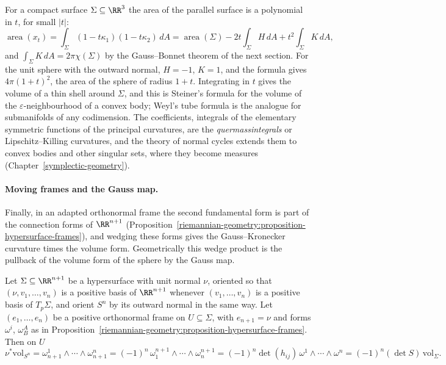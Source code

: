 \begin{remark}\label{riemannian-geometry:remark-steiner}
For a compact surface $\Sigma \subseteq \RR^3$ the area of the parallel surface is a polynomial in $t$, for small $|t|$:
\[
\operatorname{area}(x_t) = \int_\Sigma(1 - t\kappa_1)(1 - t\kappa_2)\,dA = \operatorname{area}(\Sigma) - 2t\int_\Sigma H\,dA + t^2\int_\Sigma K\,dA,
\]
and $\int_\Sigma K\,dA = 2\pi\chi(\Sigma)$ by the Gauss--Bonnet theorem of the next section. For the unit sphere with the outward normal, $H = -1$, $K = 1$, and the formula gives $4\pi(1 + t)^2$, the area of
the sphere of radius $1 + t$. Integrating in $t$ gives the volume of a thin shell around $\Sigma$, and this is Steiner's formula for the volume of the $\varepsilon$-neighbourhood of a convex body; Weyl's tube formula
is the analogue for submanifolds of any codimension. The coefficients, integrals of the elementary symmetric functions of the principal curvatures, are the \emph{quermassintegrals} or Lipschitz--Killing curvatures,
and the theory of normal cycles extends them to convex bodies and other singular sets, where they become measures (Chapter~\ref{symplectic-geometry}).
\end{remark}

\paragraph{Moving frames and the Gauss map.} Finally, in an adapted orthonormal frame the second fundamental form is part of the connection forms of $\RR^{n+1}$
(Proposition~\ref{riemannian-geometry:proposition-hypersurface-frames}), and wedging these forms gives the Gauss--Kronecker curvature times the volume form. Geometrically this wedge product is the pullback of the volume
form of the sphere by the Gauss map.

\begin{proposition}\label{riemannian-geometry:proposition-gauss-map-volume}
Let $\Sigma \subseteq \RR^{n+1}$ be a hypersurface with unit normal $\nu$, oriented so that $(\nu, v_1, \ldots, v_n)$ is a positive basis of $\RR^{n+1}$ whenever $(v_1, \ldots, v_n)$ is a positive basis of $T_p\Sigma$, and orient
$S^n$ by its outward normal in the same way. Let $(e_1, \ldots, e_n)$ be a positive orthonormal frame on $U \subseteq \Sigma$, with $e_{n+1} = \nu$ and forms $\omega^i$, $\omega^A_B$ as in
Proposition~\ref{riemannian-geometry:proposition-hypersurface-frames}. Then on $U$
\[
\nu^*\mathrm{vol}_{S^n} = \omega^1_{n+1} \wedge \cdots \wedge \omega^n_{n+1} = (-1)^n\,\omega^{n+1}_1 \wedge \cdots \wedge \omega^{n+1}_n = (-1)^n\det(h_{ij})\,\omega^1 \wedge \cdots \wedge \omega^n = (-1)^n(\det S)\,\mathrm{vol}_\Sigma .
\]
\end{proposition}

